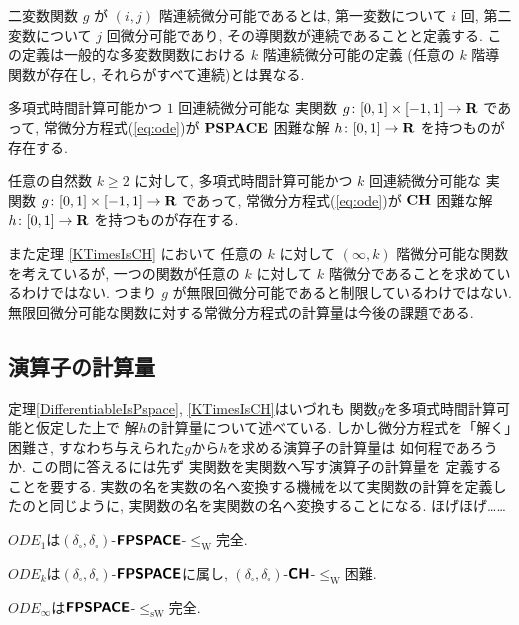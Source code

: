  二変数関数 $g$ が $(i, j)$ 階連続微分可能であるとは,
 第一変数について $i$ 回, 第二変数について $j$ 回微分可能であり,
 その導関数が連続であることと定義する.
 この定義は一般的な多変数関数における $k$ 階連続微分可能の定義
 (任意の $k$ 階導関数が存在し, それらがすべて連続)とは異なる.

 \begin{collorary}
  多項式時間計算可能かつ $1$ 回連続微分可能な
  実関数 $g \colon [0,1] \times [-1,1] \to \mathbf R$ であって, 
  常微分方程式(\ref{eq:ode})が
  $\mathbf{PSPACE}$ 困難な解 $h \colon [0, 1] \to \mathbf R$ を持つものが存在する.
 \end{collorary}

 \begin{collorary}
  任意の自然数 $k \ge 2$ に対して, 
  多項式時間計算可能かつ $k$ 回連続微分可能な
  実関数 $g \colon [0,1] \times [-1,1] \to \mathbf R$ であって, 
  常微分方程式(\ref{eq:ode})が
  $\mathbf{CH}$ 困難な解 $h \colon [0, 1] \to \mathbf R$ を持つものが存在する.
 \end{collorary}

 また定理 \ref{KTimesIsCH} において
 任意の $k$ に対して $(\infty, k)$ 階微分可能な関数を考えているが,
 一つの関数が任意の $k$ に対して $k$ 階微分であることを求めているわけではない.
 つまり $g$ が無限回微分可能であると制限しているわけではない. 
 無限回微分可能な関数に対する常微分方程式の計算量は今後の課題である.


\subsection{演算子の計算量}

定理\ref{DifferentiableIsPspace}, 
\ref{KTimesIsCH}はいづれも
関数$g$を多項式時間計算可能と仮定した上で
解$h$の計算量について述べている. 
しかし微分方程式を「解く」困難さ, 
すなわち与えられた$g$から$h$を求める演算子の計算量は
如何程であろうか. 
この問に答えるには先ず
実関数を実関数へ写す演算子の計算量を
定義することを要する. 
実数の名を実数の名へ変換する機械を以て実関数の計算を定義したのと同じように, 
実関数の名を実関数の名へ変換することになる. 
ほげほげ……

\newcommand{\OpDiffIVP}{\mathit{ODE}}
\newcommand{\deltabox}{\delta _\square}
\newcommand{\classtwofont}[1]{\text{\bfseries \sffamily \upshape #1}}
\newcommand{\classFPSPACEtwo}{\classtwofont{FPSPACE}}
\newcommand{\classCHtwo}{\classtwofont{CH}}
\newcommand{\redW}{\leq _{\mathrm W}}
\newcommand{\redSW}{\leq _{\mathrm{sW}}}

\begin{theorem}
$\OpDiffIVP _1$は$(\deltabox, \deltabox)$-$\classFPSPACEtwo$-$\redW$完全. 
\end{theorem}

\begin{theorem}
$\OpDiffIVP _k$は$(\deltabox, \deltabox)$-$\classFPSPACEtwo$に属し, 
$(\deltabox, \deltabox)$-$\classCHtwo$-$\redW$困難. 
\end{theorem}

\begin{theorem}
$\OpDiffIVP _\infty$は$\classFPSPACEtwo$-$\redSW$完全. 
\end{theorem}

